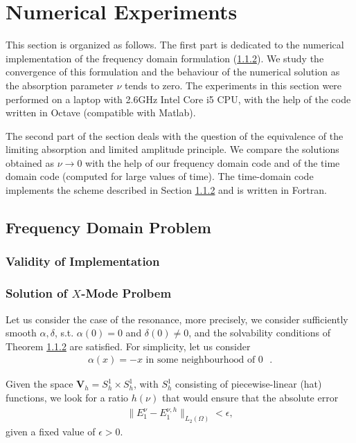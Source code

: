 \documentclass[proc]{edpsmath}
\begin{document}
\section{Numerical Experiments}
This section is organized as follows. The first part is dedicated to the numerical implementation
of the frequency domain formulation (\ref{}). We study the convergence of this formulation and the behaviour 
of the numerical solution as the absorption parameter $\nu$ tends to zero. The experiments in this section were 
performed on a laptop with 2.6GHz Intel Core i5 CPU, with the help of the code written in Octave (compatible with Matlab). 

The second part of the section deals with the question of the equivalence of the limiting absorption and limited amplitude 
principle. We compare the solutions obtained as $\nu\rightarrow 0$ with the help of our frequency domain code 
and of the time domain code (computed for large values of time). 
The time-domain code implements the scheme described in Section \ref{} and 
is written in Fortran. 
\subsection{Frequency Domain Problem}
\subsubsection{Validity of Implementation}
\subsubsection{Solution of $X$-Mode Prolbem}

Let us consider the case of the resonance, more precisely, we consider sufficiently smooth
$\alpha,\delta$, s.t. $\alpha(0)=0$ and $\delta(0)\neq 0$, and the solvability conditions 
of Theorem \ref{}  are satisfied. 
For simplicity, let us consider 
\begin{align}
\label{eq:cond}
 \alpha(x)=-x \text{  in some neighbourhood of $0$ }.
\end{align}


Given the space $\mathbf{V}_{h}=S_{h}^{1}\times S_{h}^{1}$, with $S_{h}^{1}$ consisting of piecewise-linear (hat) functions, we look for a ratio $h(\nu)$ that would ensure that the absolute error 
\begin{align}
\label{eq:problem1}
\|E^{\nu}_{1}-E^{\nu,h}_{1}\|_{L_{2}(\Omega)}<\epsilon,
\end{align}
given a fixed value of $\epsilon>0$. 
\end{document}
